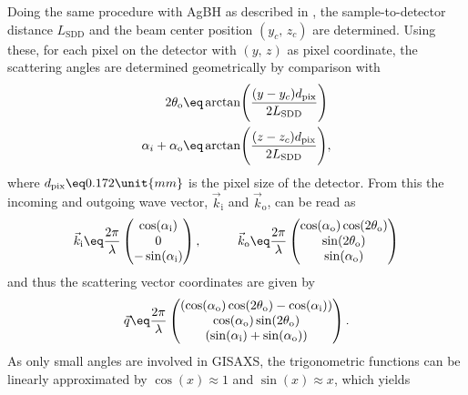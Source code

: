 \documentclass[\main/dresen_thesis.tex]{subfiles}
\begin{document}
    Doing the same procedure with AgBH as described in , the sample-to-detector distance $L_\mathrm{SDD}$ and the beam center position $(y_c,\,z_c)$ are determined.
    Using these, for each pixel on the detector with $(y,\,z)$ as pixel coordinate, the scattering angles are determined geometrically by comparison with 
    \begin{align}
      \begin{split}
        2 \theta_\mathrm{o} &\eq \arctan \Biggl( \frac{(y - y_c) d_\mathrm{pix}}{2 L_\mathrm{SDD}} \Biggl)\\
        \alpha_i + \alpha_\mathrm{o} &\eq \arctan \Biggl( \frac{(z - z_c) d_\mathrm{pix}}{2 L_\mathrm{SDD}} \Biggl),
      \end{split}
    \end{align}
    where $d_\mathrm{pix} \eq 0.172 \unit{mm}$ is the pixel size of the detector.
    From this the incoming and outgoing wave vector, $\vec{k}_\mathrm{i}$ and $\vec{k}_\mathrm{o}$, can be read as
    \begin{align}
      \vec{k}_\mathrm{i} \eq \frac{2 \pi}{\lambda} \begin{pmatrix}
        \cos(\alpha_\mathrm{i})\\
        0\\
        -\sin(\alpha_\mathrm{i})
      \end{pmatrix}, \hspace{1cm}
      \vec{k}_\mathrm{o} \eq \frac{2 \pi}{\lambda} \begin{pmatrix}
        \cos(\alpha_\mathrm{o}) \cos(2\theta_\mathrm{o})\\
        \sin(2\theta_\mathrm{o})\\
        \sin(\alpha_\mathrm{o})
      \end{pmatrix}
    \end{align}
    and thus the scattering vector coordinates are given by
    \begin{align}
      \vec{q} \eq \frac{2 \pi}{\lambda} \begin{pmatrix}
        (\cos(\alpha_\mathrm{o}) \cos(2 \theta_\mathrm{o}) - \cos(\alpha_\mathrm{i}))\\
        \cos(\alpha_\mathrm{o}) \sin(2 \theta_\mathrm{o})\\
        (\sin(\alpha_\mathrm{i}) + \sin(\alpha_\mathrm{o}))
      \end{pmatrix}.
    \end{align}
    As only small angles are involved in GISAXS, the trigonometric functions can be linearly approximated by $\cos(x) \approx 1$ and $\sin(x) \approx x$, which yields
\end{document}
